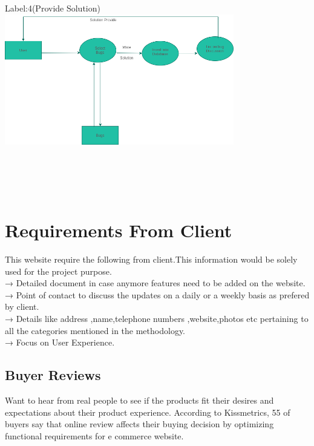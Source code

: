 \documentclass{article}
\begin{document}
\vspace{2\baselineskip}
 Label:4(Provide Solution)
 \\
\includegraphics[width=10cm]{images/bug_solution.png}
\vspace{4\baselineskip}
\\
\\
\\
\\
\\


















\section{Requirements From Client}
This website require the following from client.This information
would be solely used for the project purpose.\\
→ Detailed document in case anymore features need to be added
on the website.\\
→ Point of contact to discuss the updates on a daily or a weekly
basis as prefered by client.\\
→ Details like address ,name,telephone numbers ,website,photos
etc pertaining to all the categories mentioned in the methodology.\\
→ Focus on User Experience.\\

\subsection{Buyer Reviews}
Want to hear from real people to see if the products fit their desires and expectations about their product experience. According to Kissmetrics, 55  of buyers say that online review affects their buying decision by optimizing functional requirements for e commerce website.
 
\end{document}

